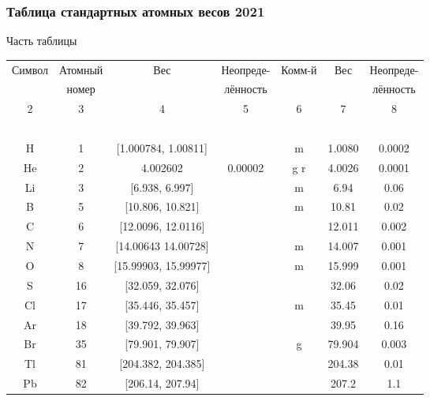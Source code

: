 \begin{frame}
	\frametitle{Таблица стандартных атомных весов 2021}
Часть таблицы
\begin{table}[h!]
	{\scriptsize 
		\begin{tabular}{ccccccc}
			Символ  & Атомный &  Вес  & Неопреде- & Комм-й &  Вес  & Неопреде-  \\
			~ & номер &  ~  & лённость &  ~  &  ~  & лённость  \\
			\hline 
			2 & 3 & 4 & 5  & 6 & 7 & 8\\
			\hline 
			~ & ~ & ~ & ~ & ~  & ~ & ~\\
			H & 1 & [1.000784, 1.00811] & ~ & m & 1.0080 & 0.0002\\ [1mm]
			He & 2 & 4.002602 & 0.00002 &  g r & 4.0026 & 0.0001 \\ [1mm]
			Li & 3 & [6.938, 6.997] & ~ & m  & 6.94 & 0.06 \\ [1mm]
			B & 5 & [10.806, 10.821] & ~ & m  & 10.81 & 0.02 \\ [1mm]
			C & 6 & [12.0096, 12.0116] & ~ & ~  & 12.011 & 0.002 \\ [1mm]
			N & 7 & [14.00643 14.00728] & ~ & m & 14.007 & 0.001 \\ [1mm]
			O & 8 & [15.99903, 15.99977] & ~ & m  & 15.999 & 0.001 \\ [1mm]
			S & 16 & [32.059, 32.076] & ~ & ~  & 32.06 & 0.02 \\ [1mm]
			Cl & 17 & [35.446, 35.457] & ~ & m  & 35.45 & 0.01 \\ [1mm]
			Ar & 18 & [39.792, 39.963] & ~ & ~  & 39.95 & 0.16 \\ [1mm]
			Br & 35 & [79.901, 79.907] & ~ & g  & 79.904 & 0.003\\ [1mm]
			Tl & 81 & [204.382, 204.385] & ~ & ~  & 204.38 & 0.01\\ [1mm]
			Pb & 82 & [206.14, 207.94] & ~ & ~  & 207.2 & 1.1\\ [1mm]
			\hline 
		\end{tabular}
	}
\end{table} 
	

\end{frame}
